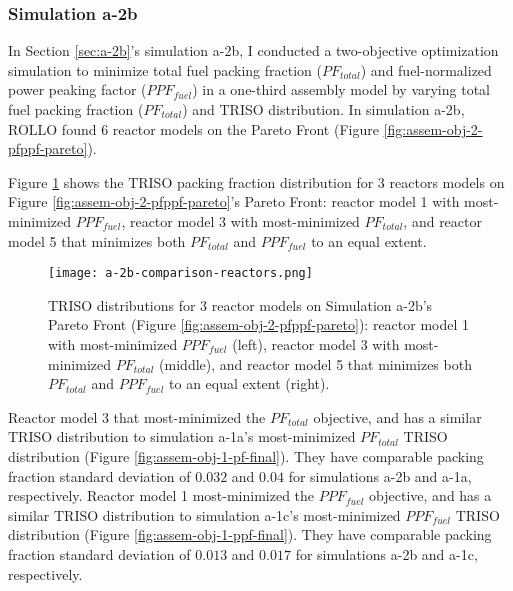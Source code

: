 
\subsubsection{Simulation a-2b}
In Section \ref{sec:a-2b}'s simulation a-2b, I conducted a two-objective 
optimization simulation to minimize total fuel packing fraction ($PF_{total}$) and 
fuel-normalized power peaking factor ($PPF_{fuel}$) in a one-third assembly model 
by varying total fuel packing fraction ($PF_{total}$) and TRISO distribution. 
In simulation a-2b, ROLLO found 6 reactor models on the Pareto Front (Figure 
\ref{fig:assem-obj-2-pfppf-pareto}). 

Figure \ref{fig:a-2b-comparison-reactors} shows the TRISO packing fraction distribution 
for 3 reactors models on Figure \ref{fig:assem-obj-2-pfppf-pareto}'s Pareto Front: 
reactor model 1 with most-minimized $PPF_{fuel}$, reactor model 3 with most-minimized 
$PF_{total}$, and reactor model 5 that minimizes both $PF_{total}$ and $PPF_{fuel}$ to an 
equal extent.
\begin{figure}[htbp!]
    \centering
    \texttt{[image: a-2b-comparison-reactors.png]}  
    \caption{TRISO distributions for 3 reactor models on Simulation a-2b's Pareto Front (Figure 
    \ref{fig:assem-obj-2-pfppf-pareto}): reactor model 1 with most-minimized $PPF_{fuel}$ (left), 
    reactor model 3 with most-minimized $PF_{total}$ (middle), and reactor model 5 that 
    minimizes both $PF_{total}$ and $PPF_{fuel}$ to an equal extent (right).}
    \label{fig:a-2b-comparison-reactors}
\end{figure}

Reactor model 3 that most-minimized the $PF_{total}$ objective, and has a similar TRISO 
distribution to simulation a-1a's most-minimized $PF_{total}$ TRISO distribution 
(Figure \ref{fig:assem-obj-1-pf-final}). 
They have comparable packing fraction standard deviation of $0.032$ and $0.04$ for 
simulations a-2b and a-1a, respectively. 
Reactor model 1 most-minimized the $PPF_{fuel}$ objective, and has a similar TRISO 
distribution to simulation a-1c's most-minimized $PPF_{fuel}$ TRISO distribution 
(Figure \ref{fig:assem-obj-1-ppf-final}). 
They have comparable packing fraction standard deviation of $0.013$ and $0.017$ for 
simulations a-2b and a-1c, respectively. 

